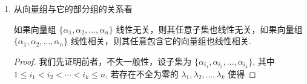 \begin{enumerate}
\begin{solution}
              即

              \[
                  x_1(1, -3, 1) + x_2(-1, 2, -2) + x_3(1, 1, 3) = (0, 0, 0).
              \]

              这个向量方程等价于以下的三个元线性齐次方程组:

              \[
                  \begin{cases}
                      x_1 - x_2 + x_3 = 0    \\
                      -3x_1 + 2x_2 + x_3 = 0 \\
                      x_1 - 2x_2 + 3x_3 = 0
                  \end{cases},
              \]

              容易解得这个方程组只有零解 $x_1 = x_2 = x_3 = 0$. 即只有全为零的 $x_1, x_2, x_3$ 才使得\autoref{eq:线性相关性:1} 成立, 故 $\beta_1, \beta_2, \beta_3$ 线性无关.

              一般若 $\beta_1 = (a_1, b_1, c_1), \beta_2 = (a_2, b_2, c_2), \beta_3 = (a_3, b_3, c_3)$, 则 $\beta_1, \beta_2, \beta_3$ 线性相关（线性无关）的充要条件是三元线性齐次方程组

              \[
                  \begin{cases}
                      a_1 x_1 + a_2 x_2 + a_3 x_3 = 0 \\
                      b_1 x_1 + b_2 x_2 + b_3 x_3 = 0 \\
                      c_1 x_1 + c_2 x_2 + c_3 x_3 = 0
                  \end{cases}
              \]

              有非零解（只有零解）. 用此法可得 $\mathbf{R}^3$ 中任何 4 个向量, $\mathbf{R}^n$ 中任何 $n + 1$ 个向量都线性相关.

              总的来说，我们有以下结论：

              列向量组$\alpha_1,\alpha_2,\ldots,\alpha_m$线性相关$\iff$齐次线性方程组$x_1\alpha_1+x_2\alpha_2+\cdots+x_m\alpha_m=0$有非零解;

              列向量组$\alpha_1,\alpha_2,\ldots,\alpha_m$线性无关$\iff$齐次线性方程组$x_1\alpha_1+x_2\alpha_2+\cdots+x_m\alpha_m=0$只有零解.
          \end{solution}
    \item 从向量组与它的部分组的关系看
          \begin{example}{}{}
              如果向量组 $\{ \alpha_1,\alpha_2,\ldots,\alpha_n \}$ 线性无关，则其任意子集也线性无关，如果向量组 $\{ \alpha_1,\alpha_2,\ldots,\alpha_n \}$ 线性相关，则其任意包含它的向量组也线性相关.
          \end{example}
          \begin{proof}
              我们先证明前者，不失一般性，设子集为 $\{ \alpha_{i_1},\alpha_{i_2},\ldots,\alpha_{i_k} \}$, 其中 $1 \leqslant i_1 < i_2 < \cdots < i_k \leqslant n$, 若存在不全为零的 $\lambda_1,\lambda_2,\ldots,\lambda_k$ 使得


\end{proof}
\end{enumerate}
